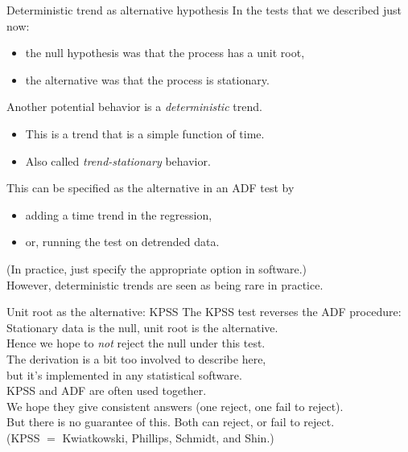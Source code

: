 \documentclass[t,12pt]{beamer}
\begin{document}
\begin{frame}[c]{Deterministic trend as alternative hypothesis}
\vspace{-0.15in}
In the tests that we described just now:
\begin{itemize}
\item the null hypothesis was that the process has a unit root, 
\item the alternative was that the process is stationary.
\end{itemize}
\medskip
Another potential behavior is a \emph{deterministic} trend.
\begin{itemize}
\item This is a trend that is a simple function of time.
\item Also called \emph{trend-stationary} behavior.
\end{itemize}
\medskip
This can be specified as the alternative in an ADF test by
\begin{itemize}
\item adding a time trend in the regression,
\item or, running the test on detrended data.
\end{itemize}
(In practice, just specify the appropriate option in software.)
\\ \medskip
However, deterministic trends are seen as being rare in practice.
\end{frame}

\begin{frame}[c]{Unit root as the alternative: KPSS}
The KPSS test reverses the ADF procedure:
\\ Stationary data is the null, unit root is the alternative.
\\ Hence we hope to \emph{not} reject the null under this test.
\\ \bigskip
The derivation is a bit too involved to describe here,
\\ but it's implemented in any statistical software.
\\ \bigskip
KPSS and ADF are often used together.
\\ We hope they give consistent answers (one reject, one fail to reject).
\\ But there is no guarantee of this. Both can reject, or fail to reject.
\\ \bigskip\bigskip
{\footnotesize (KPSS $=$ Kwiatkowski, Phillips, Schmidt, and Shin.)}
\end{frame}
\end{document}
